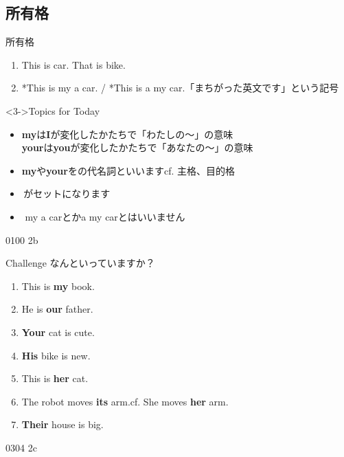 \documentclass[aspectratio=169,xcolor={dvipsnames,table}]{beamer}
\begin{document}
\subsection{所有格}
\begin{frame}[plain]{所有格}
 \begin{enumerate}
  \item<2-> This is  car. That is  bike.
  \item<6-> *This is my a car. / *This is a my car.\hfill{\scriptsize * 「まちがった英文です」という記号}
 \end{enumerate}


\begin{block}<3->{Topics for Today}
\begin{itemize}[circle]
 \item \textbf{my}は\textbf{I}が変化したかたちで「わたしの～」の意味\\
\textbf{your}は\textbf{you}が変化したかたちで「あなたの～」の意味
 \item<4-> \textbf{my}や\textbf{your}をの代名詞といいます\hfill{}cf. 主格、目的格
 \item<5-> \,がセットになります
 \item[]<7-> \mbox{}\hfill\dbend\,\,my a carとかa my carとはいいません\hspace{.5\zw}\mbox{}\\
\mbox{}
\end{itemize}
     \end{block}
\hfill{\tiny 0100}\,{\scriptsize {}\,2b}

\end{frame}
\begin{frame}[plain]{Challenge}
 なんといっていますか？\pause

\begin{enumerate}[<+->]
 \item This is \textbf{my} book.
 \item He is \textbf{our} father.
 \item \textbf{Your} cat is cute.
 \item \textbf{His} bike is new.
 \item This is \textbf{her} cat.
 \item The robot moves \textbf{its} arm.\hfill{}cf. She moves \textbf{her} arm.
 \item \textbf{Their} house is big.
\end{enumerate}

\hfill{\tiny 0304}\,{\scriptsize {}\,2c}

\end{frame}
\end{document}
